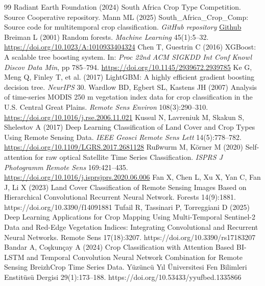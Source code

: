 \documentclass[journal]{IEEEtran}
\begin{document}
\begin{thebibliography}{99}
Radiant Earth Foundation (2024) South Africa Crop Type Competition. Source Cooperative repository.
Mann ML (2025) South\_Africa\_Crop\_Comp: Source code for multitemporal crop classification. \textit{GitHub repository}
\href{https://github.com/mmann1123/South_Africa_Crop_Comp}{Github}
Breiman L (2001) Random forests. \textit{Machine Learning} 45(1):5--32. \href{https://doi.org/10.1023/A:1010933404324}{https://doi.org/10.1023/A:1010933404324}
Chen T, Guestrin C (2016) XGBoost: A scalable tree boosting system. In: \textit{Proc 22nd ACM SIGKDD Int Conf Knowl Discov Data Min}, pp 785--794. \href{https://doi.org/10.1145/2939672.2939785}{https://doi.org/10.1145/2939672.2939785}
Ke G, Meng Q, Finley T, et al. (2017) LightGBM: A highly efficient gradient boosting decision tree. \textit{NeurIPS} 30.
Wardlow BD, Egbert SL, Kastens JH (2007) Analysis of time-series MODIS 250 m vegetation index data for crop classification in the U.S. Central Great Plains. \textit{Remote Sens Environ} 108(3):290--310. \href{https://doi.org/10.1016/j.rse.2006.11.021}{https://doi.org/10.1016/j.rse.2006.11.021}
Kussul N, Lavreniuk M, Skakun S, Shelestov A (2017) Deep Learning Classification of Land Cover and Crop Types Using Remote Sensing Data. \textit{IEEE Geosci Remote Sens Lett} 14(5):778--782. \href{https://doi.org/10.1109/LGRS.2017.2681128}{https://doi.org/10.1109/LGRS.2017.2681128}
Ru\ss{}wurm M, K\"orner M (2020) Self-attention for raw optical Satellite Time Series Classification. \textit{ISPRS J Photogramm Remote Sens} 169:421--435. \href{https://doi.org/10.1016/j.isprsjprs.2020.06.006}{https://doi.org/10.1016/j.isprsjprs.2020.06.006}
Fan X, Chen L, Xu X, Yan C, Fan J, Li X (2023) Land Cover Classification of Remote Sensing Images Based on Hierarchical Convolutional Recurrent Neural Network. Forests 14(9):1881. https://doi.org/10.3390/f14091881
Tufail R, Tassinari P, Torreggiani D (2025) Deep Learning Applications for Crop Mapping Using Multi-Temporal Sentinel-2 Data and Red-Edge Vegetation Indices: Integrating Convolutional and Recurrent Neural Networks. Remote Sens 17(18):3207. https://doi.org/10.3390/rs17183207
Bandar A, Co\c{s}kun\c{c}ay A (2024) Crop Classification with Attention Based BI-LSTM and Temporal Convolution Neural Network Combination for Remote Sensing BreizhCrop Time Series Data. Y\"uz\"unc\"u Y{\i}l \"Universitesi Fen Bilimleri Enstit\"us\"u Dergisi 29(1):173--188. https://doi.org/10.53433/yyufbed.1335866

\end{thebibliography}
\end{document}
